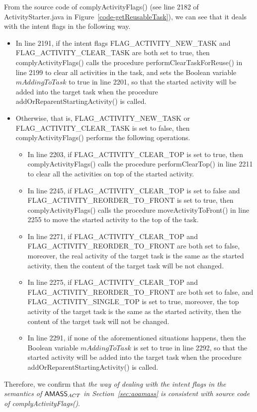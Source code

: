 \begin{itemize}
From the source code of complyActivityFlags() (see line 2182 of ActivityStarter.java in Figure~\ref{code-getReusableTask}), we can see that it deals with the intent flags in the following way. 
\begin{itemize}
\item In line 2191, if the intent flags FLAG\_ACTIVITY\_NEW\_TASK and FLAG\_ACTIVITY\_CLEAR\_TASK are both set to true, then complyActivityFlags() calls the procedure performClearTaskForReuse() in line 2199 to clear all activities in the task, and sets the Boolean variable $mAddingToTask$ to true in line 2201, so that the started activity will be added into the target task when the procedure addOrReparentStartingActivity() is called.
%
\item Otherwise, that is, FLAG\_ACTIVITY\_NEW\_TASK or FLAG\_ACTIVITY\_CLEAR\_TASK is set to false, then complyActivityFlags() performs the following operations. 
\begin{itemize}
\item In line 2203, if FLAG\_ACTIVITY\_CLEAR\_TOP is set to true, then complyActivityFlags() calls the procedure performClearTop() in line 2211 to clear all the activities on top of the started activity.
%
\item In line 2245, if FLAG\_ACTIVITY\_CLEAR\_TOP is set to false and FLAG\_ACTIVITY\_REORDER\_TO\_FRONT is set to true, then complyActivityFlags() calls the procedure moveActivityToFront() in line 2255 to move the started activity to the top of the task.
%
\item In line 2271, if FLAG\_ACTIVITY\_CLEAR\_TOP and FLAG\_ACTIVITY\_REORDER\_TO\_FRONT are both set to false, moreover, the real activity of the target task is the same as the started activity, then the content of the target task will be not changed. 
%
\item  In line 2275, if FLAG\_ACTIVITY\_CLEAR\_TOP and FLAG\_ACTIVITY\_REORDER\_TO\_FRONT are both set to false, and FLAG\_ACTIVITY\_SINGLE\_TOP is set to true, moreover, the top activity of the target task is the same as the started activity, then the content of the target task will not be changed. 
%
\item In line 2291, if none of the aforementioned situations happens, then the Boolean variable $mAddingToTask$ is set to true in line 2292, so that the started activity will be added into the target task when the procedure addOrReparentStartingActivity() is called. 
\end{itemize}
\end{itemize}
Therefore, we confirm that \emph{the way of dealing with the intent flags in the semantics of $\textsf{AMASS}_{ACT}$ in Section~\ref{sec:aoamass} is consistent with source code of complyActivityFlags()}. 

\end{itemize}
